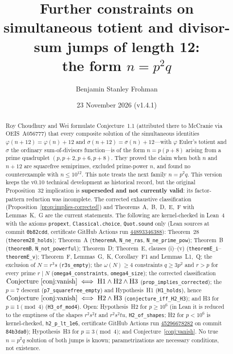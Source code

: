 \documentclass[11pt,reqno]{amsart}
\title[Totient and divisor-sum jumps of length 12]{Further constraints on simultaneous totient and divisor-sum jumps of length 12:\\ the form \(n=p^2q\)}
\author{Benjamin Stanley Frohman}
\date{23 November 2026 (v1.4.1)}
\newcommand{\ph}{\varphi}
\newcommand{\sig}{\sigma}
\theoremstyle{definition}
\begin{document}
\begin{abstract}
Roy Choudhury and Wei formulate Conjecture~1.1 (attributed there to McCranie via OEIS~A056777) that every composite solution of the simultaneous identities
\(\ph(n+12)=\ph(n)+12\) and \(\sig(n+12)=\sig(n)+12\)---with \(\ph\) Euler's totient and \(\sig\) the ordinary sum-of-divisors function---is of the form \(n=p(p+8)\) arising from a prime quadruplet
\((p,p+2,p+6,p+8)\). They proved the claim when both \(n\) and \(n+12\) are squarefree semiprimes, excluded prime-power
\(n\), and found no counterexample with \(n\le 10^{12}\). This note treats the next family \(n=p^2q\).
This version keeps the v0.10 technical development as historical record, but the original Proposition~32 implication is \textbf{superseded and not currently valid}: its factor-pattern reduction was incomplete. The corrected exhaustive classification (Proposition~\ref{prop:implies-corrected}) and Theorems~A,~B,~D,~E,~F with Lemmas~K,~G are the current statements. The following are kernel-checked in Lean~4 with the axioms \texttt{propext}, \texttt{Classical.choice}, \texttt{Quot.sound} only (Lean sources at commit \texttt{0b82cdd}, certificate GitHub Actions run \href{https://github.com/BenFrohman/p2q-jumps-lean/actions/runs/44893346388}{44893346388}): Theorem~28 (\texttt{theorem28\_holds}); Theorem~A (\texttt{theoremA}, \texttt{N\_ne\_ras}, \texttt{N\_ne\_prime\_pow}); Theorem~B (\texttt{theoremB}, \texttt{N\_not\_powerful}); Theorem~D; Theorem~E, clauses (i)--(v) (\texttt{theoremE\_i}--\texttt{theoremE\_v}); Theorem~F, Lemmas~G,~K, Corollary~F1 and Lemmas~L1,~Q; the exclusion of \(N=r^3s\) (\texttt{r3s\_empty}); the \(\omega(N)\ge 4\) constraints \(q\ge 3p^2\) and \(r>p\) for every prime \(r\mid N\) (\texttt{omega4\_constraints}, \texttt{omega4\_size}); the corrected classification \(\text{Conjecture~\ref{conj:vanish}}\iff\text{H1}\wedge\text{H2}\wedge\text{H3}\) (\texttt{prop\_implies\_corrected}); the \(p=7\) descent (\texttt{p7\_squarefree\_empty}) and Hypothesis~H1 (\texttt{H1\_holds}), hence \(\text{Conjecture~\ref{conj:vanish}}\iff\text{H2}\wedge\text{H3}\) (\texttt{conjecture\_iff\_H2\_H3}); and H3 for \(p\equiv 1\pmod 4\) (\texttt{H3\_of\_mod4}). Open: Hypothesis~H2 for \(p\ge 10^6\) (in Lean it is reduced to the emptiness of the shapes \(r^2s^2t\) and \(r^2s^2tu\), \texttt{H2\_of\_shapes}; H2 for \(p<10^6\) is kernel-checked, \texttt{h2\_p\_lt\_1e6}, certificate GitHub Actions run \href{https://github.com/BenFrohman/p2q-jumps-lean/actions/runs/45296678282}{45296678282} on commit \texttt{84b3da0}); Hypothesis~H3 for \(p\equiv 3\pmod 4\); and Conjecture~\ref{conj:vanish}. No true \(n=p^2q\) solution of both jumps is known; parametrizations are necessary conditions, not existence.


\end{abstract}
\end{document}
